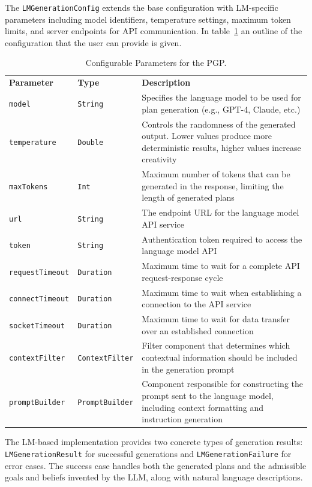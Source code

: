 \documentclass[12pt,a4paper,openright,twoside]{book}
\begin{document}
The \texttt{LMGenerationConfig} extends the base configuration with LM-specific parameters including model identifiers, temperature settings, maximum token limits, and server endpoints for API communication.
%
In table~\ref{pgp-params} an outline of the configuration that the user can provide is given.

\begin{table}[htbp]
\centering
\begin{tabular}{|l|l|p{7cm}|}
\textbf{Parameter} & \textbf{Type} & \textbf{Description} \\
\texttt{model} & \texttt{String} & Specifies the language model to be used for plan generation (e.g., GPT-4, Claude, etc.) \\
\texttt{temperature} & \texttt{Double} & Controls the randomness of the generated output. Lower values produce more deterministic results, higher values increase creativity \\
\texttt{maxTokens} & \texttt{Int} & Maximum number of tokens that can be generated in the response, limiting the length of generated plans \\
\texttt{url} & \texttt{String} & The endpoint URL for the language model API service \\
\texttt{token} & \texttt{String} & Authentication token required to access the language model API \\
\texttt{requestTimeout} & \texttt{Duration} & Maximum time to wait for a complete API request-response cycle \\
\texttt{connectTimeout} & \texttt{Duration} & Maximum time to wait when establishing a connection to the API service \\
\texttt{socketTimeout} & \texttt{Duration} & Maximum time to wait for data transfer over an established connection \\
\texttt{contextFilter} & \texttt{ContextFilter} & Filter component that determines which contextual information should be included in the generation prompt \\
\texttt{promptBuilder} & \texttt{PromptBuilder} & Component responsible for constructing the prompt sent to the language model, including context formatting and instruction generation \\
\end{tabular}
\caption{Configurable Parameters for the \ac{PGP}.}
\label{pgp-params}
\end{table}

The LM-based implementation provides two concrete types of generation results: \texttt{LMGenerationResult} for successful generations and \texttt{LMGenerationFailure} for error cases.
%
The success case handles both the generated plans and the admissible goals and beliefs invented by the \ac{LLM}, along with natural language descriptions.
\end{document}
